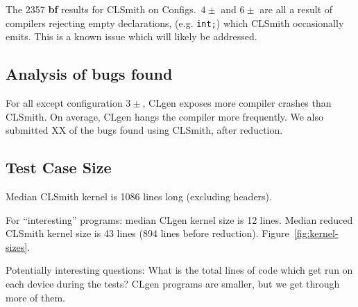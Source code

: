 

The 2357 \textbf{bf} results for CLSmith on Configs.\ $4\pm$ and $6\pm$ are all a result of compilers rejecting empty declarations, (e.g. \texttt{int;}) which CLSmith occasionally emits. This is a known issue which will likely be addressed.


\subsection{Analysis of bugs found}

For all except configuration $3\pm$, CLgen exposes more compiler crashes than CLSmith. On average, CLgen hangs the compiler more frequently. We also submitted XX of the bugs found using CLSmith, after reduction.


\subsection{Test Case Size}

Median CLSmith kernel is 1086 lines long (excluding headers).

For ``interesting'' programs: median CLgen kernel size is 12 lines. Median reduced CLSmith kernel size is 43 lines (894 lines before reduction). Figure~\ref{fig:kernel-sizes}.

Potentially interesting questions: What is the total lines of code which get run on each device during the tests? CLgen programs are smaller, but we get through more of them.



